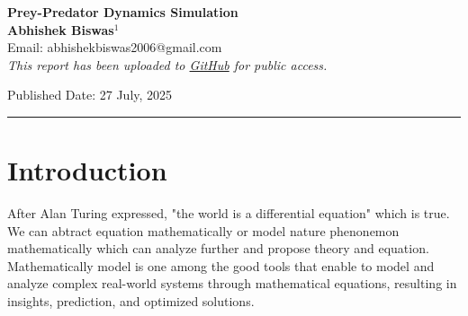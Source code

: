 \documentclass[12pt]{article}
\begin{document}
\setlength{\parindent}{1mm}
\setlength{\parskip}{1mm}

\begin{center}
\textbf{\LARGE Prey-Predator Dynamics Simulation}\\[10pt]
\textbf{Abhishek Biswas$^1$}\\
Email: abhishekbiswas2006@gmail.com\\[15pt]

\textit{This report has been uploaded to \href{https://github.com/Abhishek9824/prey-predator-dynamics-simulation}{\textbf{}GitHub} for public access. }

{\color{blue}Published Date: 27 July, 2025}
\end{center}



\rule{\textwidth}{0.5pt}

\section{Introduction}
After Alan Turing expressed, "the world is a differential equation" which is true. We can abtract equation mathematically or model nature phenonemon mathematically which can analyze further and propose theory and equation. Mathematically model is one among the good tools that enable to model and analyze complex real-world systems through mathematical equations, resulting in insights, prediction, and optimized solutions.
\end{document}
